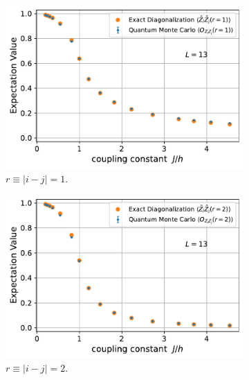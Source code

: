 \documentclass[../journal_main.tex]{subfiles}
\begin{document}
\begin{figure}[!htb]
    \centering
    \begin{subfigure}[b]{0.45\textwidth}  %
        \centering
        \includegraphics[width=\textwidth]{images/13_site/L=13_ZZ(r=1).pdf}
        \caption{$r \equiv |i-j| = 1$.}
    \end{subfigure}
    \hspace{1em}  %
    \begin{subfigure}[b]{0.45\textwidth}
        \centering
        \includegraphics[width=\textwidth]{images/13_site/L=13_ZZ(r=2).pdf}
        \caption{$r \equiv |i-j| = 2$.}
    \end{subfigure}
    \hspace{1em}  %
    \begin{subfigure}[b]{0.45\textwidth}

\end{subfigure}
\end{figure}
\end{document}
